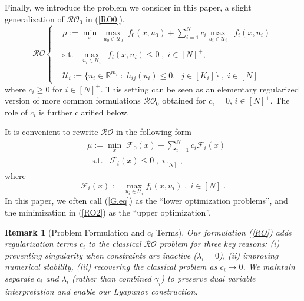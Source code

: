 \documentclass[journal,twoside,web]{ieeecolor}
\newcommand{\rev}[1]{\textcolor{revisionblue}{#1}}
\newtheorem{remark}{Remark}
\begin{document}
Finally, we introduce the problem we consider in this paper, a slight generalization of $\mathcal{RO}_0$ in (\ref{RO0}).
\begin{equation}\mathcal{RO}\left\{\begin{array}{ccc}
&\mu:=\underset{x}{\min} \;\underset{u_0\in \mathcal{U}_0}{\max}\; f_0(x,u_0)+\displaystyle\sum_{i=1}^N c_i \underset{u_i\in \mathcal{U}_i}{\max}\;\; f_i(x,u_i)\label{RO}\\ \\
&\text{s.t.}\;\;\;\underset{u_i\in \mathcal{U}_i}{\max}\;\; f_i(x,u_i)\leq 0\;,\;i\in[N]^+,\\ \\
&\mathcal{U}_i:=\{u_ i\in \mathbb{R}^{m_i}\;:\;h_{ij}(u_i)\leq 0,\;\;j\in[K_i]\}\;,\;i\in[N]
\end{array}\right.
\end{equation}
where $c_i\geq 0$ for $i\in[N]^+$. This setting can be seen as an elementary regularized version of more common formulations $\mathcal{RO}_0$ obtained for $c_i=0$, $i\in[N]^+$.
The role of $c_i$ is further clarified below.

It is convenient to rewrite $\mathcal{RO}$ in the following form
\begin{align}
&\mu:=\underset{x}{\min} \; \mathcal{F}_0(x)+\sum_{i=1}^N c_i\mathcal{F}_i(x)\label{RO2}\\
&\;\;\text{s.t.}\;\;\;\mathcal{F}_i(x)\leq 0\;,\;i^+_{[N]}\;,\nonumber
\end{align}
where
\begin{equation}\label{G.eq}
\mathcal{F}_i(x):=\max_{u_i\in \mathcal{U}_i} f_i(x,u_i)\;,\; i\in[N]\;.
\end{equation}
In this paper, we often call (\ref{G.eq}) as the ``lower optimization problems'', and the minimization in (\ref{RO2}) as the ``upper optimization''.

\begin{remark}[\rev{Problem Formulation and $c_i$ Terms}]
\rev{Our formulation (\ref{RO}) adds regularization terms $c_i$ to the classical $\mathcal{RO}$ problem for three key reasons: (i) preventing singularity when constraints are inactive ($\lambda_i = 0$), (ii) improving numerical stability, (iii) recovering the classical problem as $c_i \to 0$. We maintain separate $c_i$ and $\lambda_i$ (rather than combined $\gamma_i$) to preserve dual variable interpretation and enable our Lyapunov construction.}
\end{remark}
\end{document}

